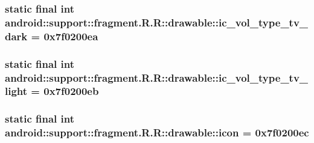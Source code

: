 \hypertarget{classandroid_1_1support_1_1fragment_1_1_r_1_1drawable_78b5bf6cdeb354acd1ca7624a51933ee}{
\subsubsection[{ic\_\-vol\_\-type\_\-tv\_\-dark}]{\setlength{\rightskip}{0pt plus 5cm}static final int android::support::fragment.R.R::drawable::ic\_\-vol\_\-type\_\-tv\_\-dark = 0x7f0200ea}}
\label{classandroid_1_1support_1_1fragment_1_1_r_1_1drawable_78b5bf6cdeb354acd1ca7624a51933ee}


\hypertarget{classandroid_1_1support_1_1fragment_1_1_r_1_1drawable_daa7f0299e87a038fc2ea0ce70cadda5}{
\subsubsection[{ic\_\-vol\_\-type\_\-tv\_\-light}]{\setlength{\rightskip}{0pt plus 5cm}static final int android::support::fragment.R.R::drawable::ic\_\-vol\_\-type\_\-tv\_\-light = 0x7f0200eb}}
\label{classandroid_1_1support_1_1fragment_1_1_r_1_1drawable_daa7f0299e87a038fc2ea0ce70cadda5}


\hypertarget{classandroid_1_1support_1_1fragment_1_1_r_1_1drawable_fabe2a59b2c70dd62416c902ae950b65}{
\subsubsection[{icon}]{\setlength{\rightskip}{0pt plus 5cm}static final int android::support::fragment.R.R::drawable::icon = 0x7f0200ec}}
\label{classandroid_1_1support_1_1fragment_1_1_r_1_1drawable_fabe2a59b2c70dd62416c902ae950b65}


